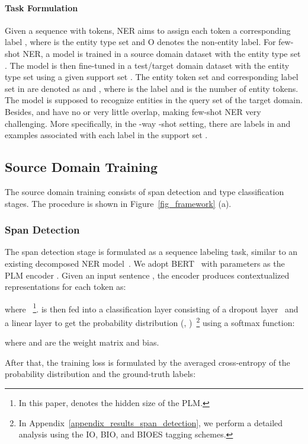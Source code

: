 \documentclass[11pt]{article}
\newcommand{\nonetoken}{\textsc{O}\xspace}
\begin{document}
\paragraph{Task Formulation}
Given a sequence  with  tokens, NER aims to assign each token  a corresponding label , where  is the entity type set and \nonetoken denotes the non-entity label.
For few-shot NER, a model is trained in a source domain dataset  with the entity type set .
The model is then fine-tuned in a test/target domain dataset  with the entity type set  using a given support set . The entity token set and corresponding label set in  are denoted as  and ,
where  is the label  and  is the number of entity tokens.
The model is supposed to recognize entities in the query set  of the target domain.
Besides,  and  have no or very little overlap, making few-shot NER very challenging.
More specifically, in the -way -shot setting, there are  labels in  and  examples associated with each label in the support set .



\subsection{Source Domain Training}
The source domain training consists of span detection and type classification stages. The procedure is shown in Figure~\ref{fig_framework} (a).
\subsubsection{Span Detection}\label{section_span_detetor}
The span detection stage is formulated as a sequence labeling task, similar to an existing decomposed NER model~\cite{ma-etal-2022-decomposed}.
We adopt BERT~\cite{devlin-etal-2019-bert} with parameters  as the PLM encoder .
Given an input sentence , the encoder produces contextualized representations for each token as:

where ~\footnote{In this paper,  denotes the hidden size of the PLM.}.
 is then fed into a classification layer consisting of a dropout layer~\cite{srivastava2014dropout} and a linear layer to get the probability distribution  (, )~\footnote{In Appendix~\ref{appendix_results_span_detection}, we perform a detailed analysis using the IO, BIO, and BIOES tagging schemes.} using a softmax function:

where  and 
are the weight matrix and bias.

After that, the training loss is formulated by the averaged cross-entropy of the probability distribution and the ground-truth labels:
\vspace{-0mm}
\end{document}
